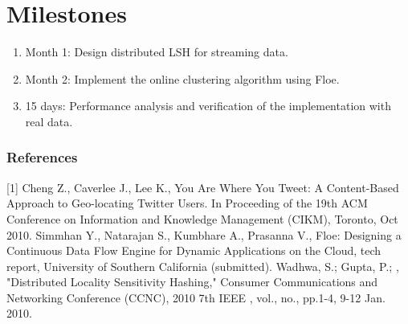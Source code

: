 \documentclass{article} %
\begin{document}
\section{Milestones}
\begin{enumerate}
\item Month 1: Design distributed LSH for streaming data.
\item Month 2: Implement the online clustering algorithm using Floe.
\item 15 days: Performance analysis and verification of the implementation with real data.
\end{enumerate}


\subsubsection*{References}


\small{

[1] 	Cheng Z., Caverlee J., Lee K., You Are Where You Tweet: A Content-Based Approach to Geo-locating Twitter Users. In Proceeding of the 19th ACM Conference on Information and Knowledge Management (CIKM), Toronto, Oct 2010. \newline
[2] Simmhan Y., Natarajan S., Kumbhare A., Prasanna V., Floe: Designing a Continuous Data Flow Engine for Dynamic Applications on the Cloud, tech report, University of Southern California (submitted). \newline
[3] Wadhwa, S.; Gupta, P.; , "Distributed Locality Sensitivity Hashing," Consumer Communications and Networking Conference (CCNC), 2010 7th IEEE , vol., no., pp.1-4, 9-12 Jan. 2010. \newline
}
\end{document}
